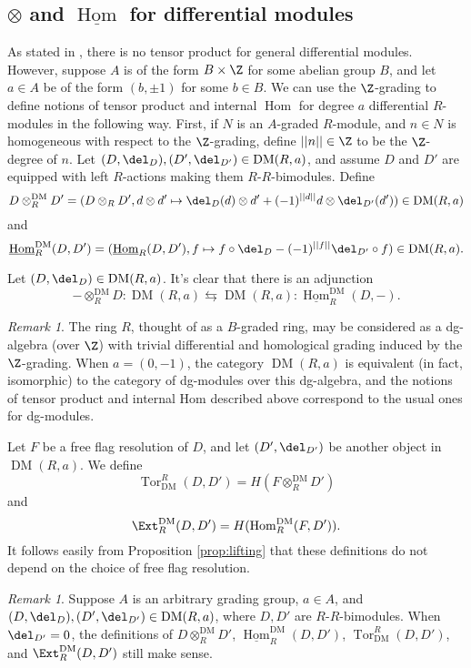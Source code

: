 \documentclass[12pt]{amsart}
\theoremstyle{definition}
\theoremstyle{remark}
\newtheorem{rem}[lemma]{Remark}
\newcommand{\Tor}{\operatorname{Tor}}
\newcommand{\Hom}{\operatorname{Hom}} %
\def\DM{\operatorname{DM}}
\begin{document}
\subsection{$\otimes$ and $\underline{\Hom}$ for differential modules}
As stated in \cite{ABI}, there is no tensor product for general differential modules. However, suppose $A$ is of the form $B \times \Z$ for some abelian group $B$, and let $a \in A$ be of the form $(b, \pm 1)$ for some $b \in B$. We can use the $\Z$-grading to define notions of tensor product and internal $\Hom$ for degree $a$ differential $R$-modules in the following way. First, if $N$ is an $A$-graded $R$-module, and $n \in N$ is homogeneous with respect to the $\Z$-grading, define $||n|| \in \Z$ to be the $\Z$-degree of $n$. Let $(D, \del_D), (D', \del_{D'}) \in \DM(R, a)$, and assume $D$ and $D'$ are equipped with left $R$-actions making them $R$-$R$-bimodules. Define
$$
D \otimes_R^{\DM} D' = (D \otimes_R D', d \otimes d' \mapsto \del_D(d) \otimes d' + (-1)^{||d||}d \otimes \del_{D'}(d')) \in \DM(R, a)
$$
and 
$$
\underline{\Hom}_R^{\DM}(D, D') = (\underline{\Hom}_R(D, D'), f \mapsto f \circ \del_D - (-1)^{||f||} \del_{D'} \circ f) \in \DM(R, a).
$$

Let $(D, \del_D) \in \DM(R,a)$. It's clear that there is an adjunction
$$
- \otimes_R^{\DM} D : \DM(R,a) \leftrightarrows \DM(R,a) : \underline{\Hom}_R^{\DM}(D, -).
$$

\begin{rem}
The ring $R$, thought of as a $B$-graded ring, may be considered as a dg-algebra (over $\Z$) with trivial differential and homological grading induced by the $\Z$-grading. When $a = (0, -1)$, the category $\DM(R, a)$ is equivalent (in fact, isomorphic) to the category of dg-modules over this dg-algebra, and the notions of tensor product and internal Hom described above correspond to the usual ones for dg-modules.
\end{rem}

Let $F$ be a free flag resolution of $D$, and let $(D', \del_{D'})$ be another object in $\DM(R, a)$. We define
$$
\Tor^R_{\DM}(D, D') = H(F \otimes^{\DM}_R D')
$$
and
$$
\Ext_R^{\DM}(D, D') = H(\Hom^{\DM}_R(F, D')).
$$
It follows easily from Proposition \ref{prop:lifting} that these definitions do not depend on the choice of free flag resolution. 



\begin{rem}
Suppose $A$ is an arbitrary grading group, $a \in A$, and $(D, \del_D), (D', \del_{D'}) \in \DM(R, a)$, where $D, D'$ are $R$-$R$-bimodules. When $\del_{D'} = 0$, the definitions of $D \otimes^{\DM}_R D'$, $\underline{\Hom}_R^{\DM}( D , D')$, $\Tor^R_{\DM}(D, D')$, and $\Ext_R^{\DM}(D, D')$ still make sense.
\end{rem}
\end{document}
